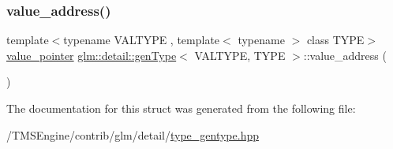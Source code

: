 \subsubsection{\texorpdfstring{value\+\_\+address()}{value\_address()}\hspace{0.1cm}{\footnotesize\ttfamily [2/2]}}
{\footnotesize\ttfamily template$<$typename V\+A\+L\+T\+Y\+PE , template$<$ typename $>$ class T\+Y\+PE$>$ \\
\hyperlink{structglm_1_1detail_1_1gen_type_a3b272e7be29ab920f2877c00646f6f9b}{value\+\_\+pointer} \hyperlink{structglm_1_1detail_1_1gen_type}{glm\+::detail\+::gen\+Type}$<$ V\+A\+L\+T\+Y\+PE, T\+Y\+PE $>$\+::value\+\_\+address (\begin{DoxyParamCaption}{ }\end{DoxyParamCaption})\hspace{0.3cm}{\ttfamily [inline]}}



The documentation for this struct was generated from the following file\+:\begin{DoxyCompactItemize}
\item 
/\+T\+M\+S\+Engine/contrib/glm/detail/\hyperlink{type__gentype_8hpp}{type\+\_\+gentype.\+hpp}\end{DoxyCompactItemize}
